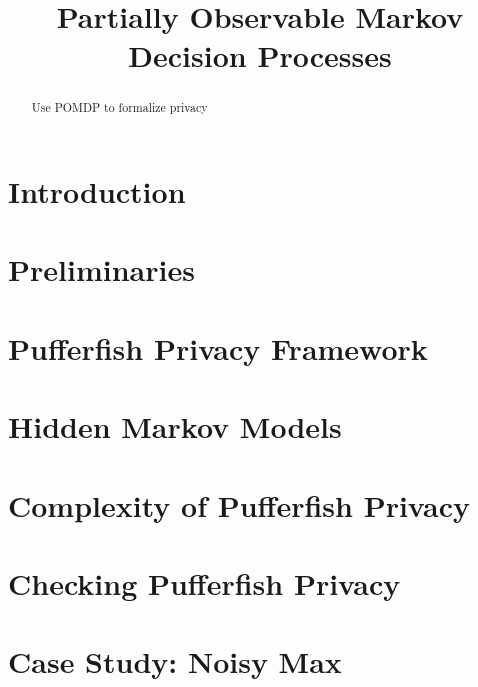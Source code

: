 \documentclass{llncs}
\title{Partially Observable Markov Decision Processes}
\begin{document}
\maketitle

\begin{abstract}
  Use POMDP to formalize privacy
\end{abstract}

\section{Introduction}
\label{section:introduction}


\section{Preliminaries}
\label{section:preliminaries}


\section{Pufferfish Privacy Framework}
\label{section:pufferfish}


\section{Hidden Markov Models}


\section{Complexity of Pufferfish Privacy}
\label{section:complexity}


\section{Checking Pufferfish Privacy}
\label{section:checking-pufferfish}


\section{Case Study: Noisy Max}
\label{section:noisy-max}




\end{document}
